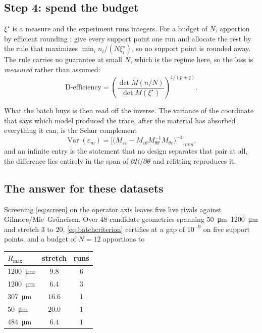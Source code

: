 \documentclass[10pt]{article}
\begin{document}
\subsection*{Step 4: spend the budget}

$\xi^\star$ is a measure and the experiment runs integers. For a budget of $N$, apportion by
efficient rounding \citep{pukelsheim1992efficient}: give every support point one run and
allocate the rest by the rule that maximizes $\min_i n_i/(N\xi^\star_i)$, so no support point
is rounded away. The rule carries no guarantee at small $N$, which is the regime here, so the
loss is \emph{measured} rather than assumed:
%
\begin{equation}
\text{D-efficiency} = \left(\frac{\det M(n/N)}{\det M(\xi^\star)}\right)^{1/(p+q)} .
\end{equation}

What the batch buys is then read off the inverse. The variance of the coordinate that says
which model produced the trace, after the material has absorbed everything it can, is the
Schur complement
%
\begin{equation}
\operatorname{Var}(\varepsilon_m) =
\Big[\big(M_{\varepsilon\varepsilon} - M_{\varepsilon\theta} M_{\theta\theta}^{-1} M_{\theta\varepsilon}\big)^{-1}\Big]_{mm} ,
\label{eq:postmaterial}
\end{equation}
%
and an infinite entry is the statement that no design separates that pair at all, the
difference lies entirely in the span of $\partial R/\partial\theta$ and refitting reproduces it.

\subsection*{The answer for these datasets}

Screening \eqref{eq:screen} on the operator axis leaves five live rivals against
Gilmore/Mie--Gr\"uneisen. Over $48$ candidate geometries spanning
\SIrange{50}{1200}{\micro\metre} and stretch $3$ to $20$, \eqref{eq:batchcriterion} certifies at
a gap of $10^{-9}$ on five support points, and a budget of $N=12$ apportions to

\begin{center}
\begin{tabular}{lcc}
\toprule
$R_{\max}$ & stretch & runs \\
\midrule
\SI{1200}{\micro\metre} & $9.8$ & $6$ \\
\SI{1200}{\micro\metre} & $6.4$ & $3$ \\
\SI{307}{\micro\metre} & $16.6$ & $1$ \\
\SI{50}{\micro\metre} & $20.0$ & $1$ \\
\SI{484}{\micro\metre} & $6.4$ & $1$ \\
\bottomrule
\end{tabular}
\end{center}
\end{document}
